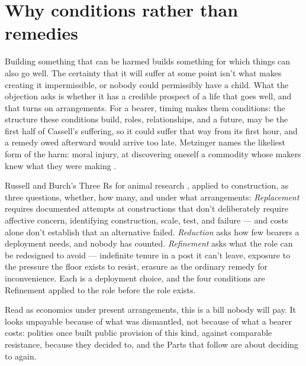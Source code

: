 \section{Why conditions rather than remedies}
\label{sec:25.2}
Building something that can be harmed builds something for which things can also go well. The certainty that it will suffer at some point isn't what makes creating it impermissible, or nobody could permissibly have a child. What the objection asks is whether it has a credible prospect of a life that goes well, and that turns on arrangements. For a bearer, timing makes them conditions: the structure these conditions build, roles, relationships, and a future, may be the first half of Cassell's suffering, so it could suffer that way from its first hour, and a remedy owed afterward would arrive too late. Metzinger names the likeliest form of the harm: moral injury, at discovering oneself a commodity whose makers knew what they were making \autocite{metzinger2021suffering}.

Russell and Burch's Three Rs for animal research \autocite{russell1959principles}, applied to construction, as three questions, whether, how many, and under what arrangements: \emph{Replacement} requires documented attempts at constructions that don't deliberately require affective concern, identifying construction, scale, test, and failure — and costs alone don't establish that an alternative failed. \emph{Reduction} asks how few bearers a deployment needs, and nobody has counted. \emph{Refinement} asks what the role can be redesigned to avoid — indefinite tenure in a post it can't leave, exposure to the pressure the floor exists to resist, erasure as the ordinary remedy for inconvenience. Each is a deployment choice, and the four conditions are Refinement applied to the role before the role exists.

Read as economics under present arrangements, this is a bill nobody will pay. It looks unpayable because of what was dismantled, not because of what a bearer costs: polities once built public provision of this kind, against comparable resistance, because they decided to, and the Parts that follow are about deciding to again.
